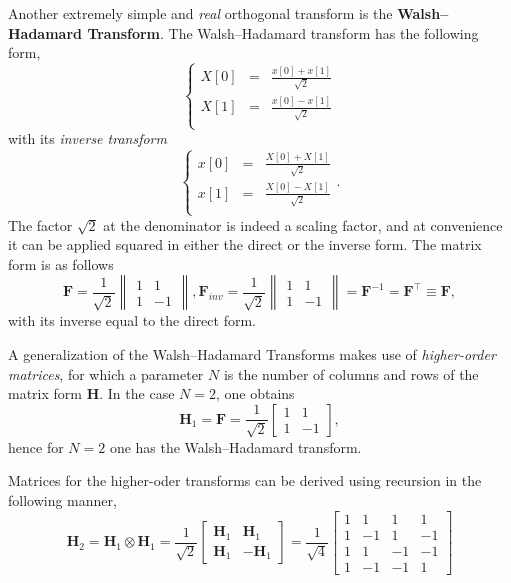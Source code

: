 \documentclass[\documentfontsize, twocolumn]{\classname}
\begin{document}
Another extremely simple and \emph{real} orthogonal transform is the \textbf{Walsh--Hadamard Transform}. The Walsh--Hadamard transform has the following form,
\begin{equation}\label{eqn:walshHadamardTransform}
    \left\{
        \begin{array}{lll}
            X[0] & = & \frac{x[0] + x[1]}{\sqrt 2}\\
            X[1] & = & \frac{x[0] - x[1]}{\sqrt 2}\\
        \end{array}
    \right.
\end{equation}
with its \emph{inverse transform}
\begin{equation}\label{eqn:walshHadamardTransformInverse}
    \left\{
        \begin{array}{lll}
            x[0] & = & \frac{X[0] + X[1]}{\sqrt 2}\\
            x[1] & = & \frac{X[0] - X[1]}{\sqrt 2}\\
        \end{array}
    \right..
\end{equation}
The factor $\sqrt 2$ at the denominator is indeed a scaling factor, and at convenience it can be applied squared in either the direct or the inverse form. The matrix form is as follows
\begin{equation}\label{eqn:walshHadamardTransformMatrixForm}
    \bm F = \frac {1}{\sqrt 2}\begin{Vmatrix} 1 & 1 \\ 1 & -1 \end{Vmatrix}, \bm F_{inv} = \frac{1}{\sqrt 2}\begin{Vmatrix} 1 & 1 \\ 1 & -1 \end{Vmatrix} = \bm F^{-1} = \bm F^\top \equiv \bm F,
\end{equation}
with its inverse equal to the direct form.

A generalization of the Walsh--Hadamard Transforms makes use of \emph{higher-order matrices}, for which a parameter $N$ is the number of columns and rows of the matrix form $\bm H$. In the case $N=2$, one obtains \[\bm H_1 = \bm F = \frac{1}{\sqrt{2}}\begin{bmatrix} 1 & 1 \\ 1 & -1 \end{bmatrix},\] hence for $N=2$ one has the Walsh--Hadamard transform.

Matrices for the higher-oder transforms can be derived using recursion in the following manner,
\[
    \bm H_2 = \bm H_1 \otimes \bm H_1 = \frac {1} {\sqrt 2}
    \begin{bmatrix}
    \bm H_1 & \bm H_1 \\
    \bm H_1 & - \bm H_1
    \end{bmatrix}
    = \frac {1} {\sqrt 4}
    \begin{bmatrix}
        1 & 1 & 1 & 1\\
        1 & -1 & 1 & -1\\
        1 & 1 & -1 & -1\\
        1 & -1 & -1 & 1
    \end{bmatrix}
\]
\end{document}
